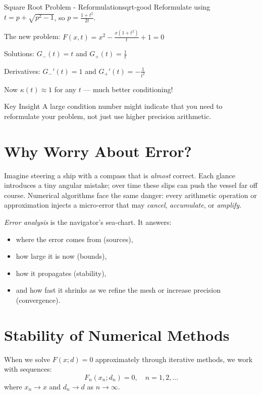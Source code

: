 \begin{example}{Square Root Problem - Reformulation}{sqrt-good}
    Reformulate using $t = p + \sqrt{p^2 - 1}$, so $p = \frac{1 + t^2}{2t}$.

    The new problem: $F(x, t) = x^2 - \frac{x(1 + t^2)}{t} + 1 = 0$

    Solutions: $G_-(t) = t$ and $G_+(t) = \frac{1}{t}$

    Derivatives: $G_-'(t) = 1$ and $G_+'(t) = -\frac{1}{t^2}$

    Now $\kappa(t) \approx 1$ for any $t$ — much better conditioning!
\end{example}

\begin{remark}{Key Insight}{}
    A large condition number might indicate that you need to reformulate your problem, not just use higher precision arithmetic.
\end{remark}

\section{Why Worry About Error?}
\label{sec:why-error}

Imagine steering a ship with a compass that is \emph{almost} correct.
Each glance introduces a tiny angular mistake; over time these slips can
push the vessel far off course.
Numerical algorithms face the same danger: every arithmetic operation or
approximation injects a micro-error that may \emph{cancel}, \emph{accumulate},
or \emph{amplify}.

\emph{Error analysis} is the navigator's sea-chart. It answers:

\begin{itemize}
    \item where the error comes from (sources),
    \item how large it is now (bounds),
    \item how it propagates (stability),
    \item and how fast it shrinks as we refine the mesh or increase precision (convergence).
\end{itemize}

\section{Stability of Numerical Methods}
\label{sec:numerical-stability}

When we solve $F(x; d) = 0$ approximately through iterative methods, we work with sequences:
\[
    F_n(x_n; d_n) = 0, \quad n = 1, 2, \ldots
\]
where $x_n \to x$ and $d_n \to d$ as $n \to \infty$.

